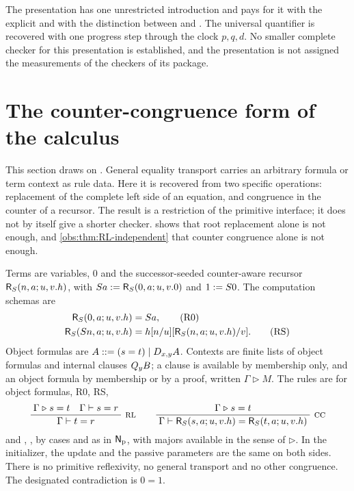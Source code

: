 \begin{remark}
The presentation has one unrestricted introduction and pays for it with the
explicit  and with the distinction between 
and . The universal quantifier is recovered with one progress
step through the clock $p,q,d$. No smaller complete checker for this
presentation is established, and the presentation is not assigned the
measurements of the checkers of its package.
\end{remark}

\section{The counter-congruence form of the calculus}
\label{obs:sec:cc}

This section draws on . General equality transport
carries an arbitrary formula or term context as rule data. Here it is recovered
from two specific operations: replacement of the complete left side of an
equation, and congruence in the counter of a recursor. The result is a
restriction of the primitive interface; it does not by itself give a shorter
checker.  shows that root replacement alone
is not enough, and \cref{obs:thm:RL-independent} that counter congruence alone
is not enough.

\begin{definition}
\label{obs:def:cc}
Terms are variables, $0$ and the successor-seeded counter-aware recursor
$\mathsf{R}_{S}(n,a;u,v.h)$, with $S a\mathrel{:=}\mathsf{R}_{S}(0,a;u,v.0)$
and $1\mathrel{:=}S 0$. The computation schemas are
\begin{align*}
\mathsf{R}_{S}(0,a;u,v.h)&=S a, \tag{R0}\\
\mathsf{R}_{S}(S n,a;u,v.h)&=h[n/u][\mathsf{R}_{S}(n,a;u,v.h)/v]. \tag{RS}
\end{align*}
Object formulas are $A::=(s=t)\mid D_{x,y}A$. Contexts are finite lists of
object formulas and internal clauses $Q_{y}B$; a clause is available by
membership only, and an object formula by membership or by a proof, written
$\Gamma\mathrel{\triangleright}M$. The rules are  for object
formulas, R0, RS,
\[
\infrule{\Gamma\mathrel{\triangleright}s=t\quad\Gamma\proves s=r}{\Gamma\proves t=r}\ \rulename{RL}
\qquad
\infrule{\Gamma\mathrel{\triangleright}s=t}{\Gamma\proves\mathsf{R}_{\Suc}(s,a;u,v.h)=\mathsf{R}_{\Suc}(t,a;u,v.h)}\ \rulename{CC}
\]
and , ,  by cases and
 as in $\mathsf{N}_{\mathrm{p}}$, with majors available in the
sense of $\triangleright$. In  the initializer, the update and the
passive parameters are the same on both sides. There is no primitive
reflexivity, no general transport and no other congruence. The designated
contradiction is $0=1$.
\end{definition}

